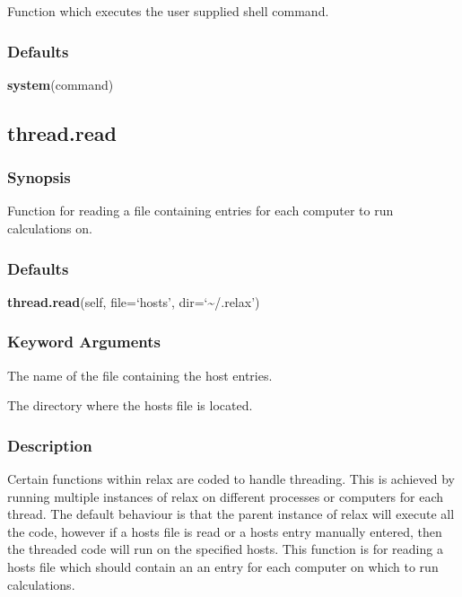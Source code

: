  Function which executes the user supplied shell command. 
  

  
 \subsubsection{Defaults} 

 \textsf{\textbf{system}(command)} 

  

 \newpage 

 \subsection{thread.read} 

  
 \subsubsection{Synopsis} 

 Function for reading a file containing entries for each computer to run calculations on. 
  

  
 \subsubsection{Defaults} 

 \textsf{\textbf{thread.read}(self, file=`hosts', dir=`\~{}/.relax')} 

  
 \subsubsection{Keyword Arguments} 

   The name of the file containing the host entries.   

   The directory where the hosts file is located.  

  

  
 \subsubsection{Description} 

 Certain functions within relax are coded to handle threading.  This is achieved by running multiple instances of relax on different processes or computers for each thread.  The default behaviour is that the parent instance of relax will execute all the code, however if a hosts file is read or a hosts entry manually entered, then the threaded code will run on the specified hosts.  This function is for reading a hosts file which should contain an an entry for each computer on which to run calculations. 
  


